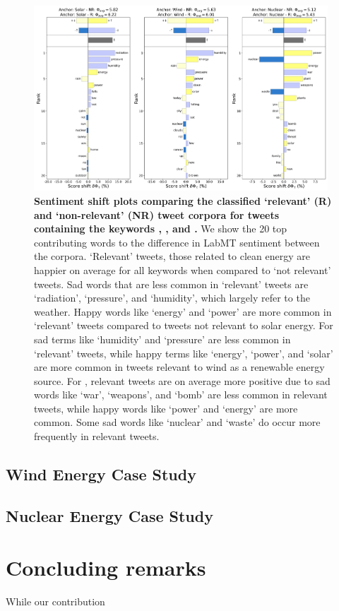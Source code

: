 \begin{figure}
  \centering	
    \includegraphics[width=0.98\textwidth]{figures/combined_shifts.png}  
  \caption{
    \textbf{Sentiment shift plots comparing the classified `relevant' (R) and `non-relevant' (NR) tweet corpora for tweets containing the keywords , , and .}
    We show the 20 top contributing words to the difference in LabMT sentiment between the corpora.
    `Relevant' tweets, those related to clean energy are happier on average for all keywords when compared to `not relevant' tweets. 
    Sad words that are less common in `relevant'  tweets are `radiation', `pressure', and `humidity', which largely refer to the weather. Happy words like `energy' and `power' are more common in `relevant' tweets compared to tweets not relevant to solar energy. For  sad terms like `humidity' and `pressure' are less common in `relevant' tweets, while happy terms like `energy', `power', and `solar' are more common in tweets relevant to wind as a renewable energy source. For , relevant tweets are on average more positive due to sad words like `war', `weapons', and `bomb' are less common in relevant tweets, while happy words like `power' and `energy' are more common. Some sad words like `nuclear' and `waste' do occur more frequently in relevant tweets.
  }
\end{figure}



\subsection{Wind Energy Case Study}
\todo{}

\subsection{ Nuclear Energy Case Study}
\todo{}

\section{Concluding remarks}
\label{sec:corpusCreation.concludingremarks}


While our contribution


